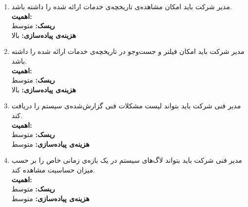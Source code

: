 \begin{enumerate}
\item
مدیر شرکت باید امکان مشاهده‌ی تاریخچه‌ی خدمات ارائه شده را داشته باشد.
\\
\textbf{اهمیت:} 
\\
\textbf{ریسک:} متوسط
\\
\textbf{هزینه‌ی پیاده‌سازی:} بالا


\item
مدیر شرکت باید امکان فیلتر و جست‌وجو در تاریخچه‌ی خدمات ارائه شده را داشته باشد.
\\
\textbf{اهمیت:} 
\\
\textbf{ریسک:} متوسط
\\
\textbf{هزینه‌ی پیاده‌سازی:} بالا

\item
مدیر فنی شرکت باید بتواند لیست مشکلات فنی گزارش‌شده‌ی سیستم را دریافت کند.
\\
\textbf{اهمیت:} 
\\
\textbf{ریسک:} متوسط
\\
\textbf{هزینه‌ی پیاده‌سازی:} متوسط



\item
مدیر فنی شرکت باید بتواند لاگ‌های سیستم در یک بازه‌ی زمانی خاص را بر حسب میزان حساسیت مشاهده کند.
\\
\textbf{اهمیت:} 
\\
\textbf{ریسک:} متوسط
\\
\textbf{هزینه‌ی پیاده‌سازی:} متوسط

\end{enumerate}